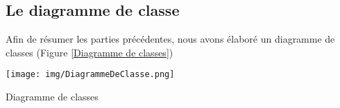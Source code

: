 \subsection{Le diagramme de classe}
Afin de résumer les parties précédentes, nous avons élaboré un diagramme de classes (Figure \ref{Diagramme de classes})
\begin{img}
  \texttt{[image: img/DiagrammeDeClasse.png]}
  \caption{Diagramme de classes}
  \label{Diagramme de classes}
\end{img}